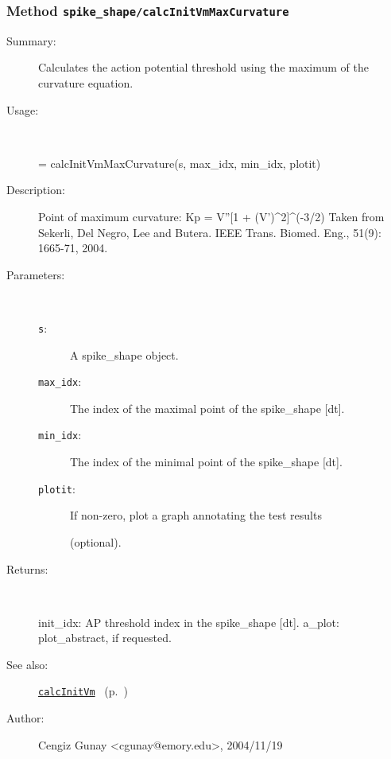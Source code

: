 \subsubsection[Method \texttt{calcInitVmMaxCurvature}]{Method \texttt{spike\_shape/calcInitVmMaxCurvature}}%
%
\label{ref_spike_shape__calcInitVmMaxCurvature}%
\hypertarget{ref_spike_shape__calcInitVmMaxCurvature}{}%
\begin{description}
\item[Summary:]Calculates the action potential threshold using the
			maximum of the curvature equation.
%
\item[Usage:]~%
\begin{lyxcode}%
[init\_idx, a\_plot] = calcInitVmMaxCurvature(s, max\_idx, min\_idx, plotit)
%
\end{lyxcode}%
%
\item[Description:]%
Point of maximum curvature: Kp = V''[1 + (V')\textasciicircum{}2]\textasciicircum{}(-3/2)
 Taken from Sekerli, Del Negro, Lee and Butera. 
 IEEE Trans. Biomed. Eng., 51(9): 1665-71, 2004.
\item[Parameters:]~
\begin{description}%
\item[\texttt{s}:]
 A spike\_shape object.
\item[\texttt{max\_idx}:]
 The index of the maximal point of the spike\_shape [dt].
\item[\texttt{min\_idx}:]
 The index of the minimal point of the spike\_shape [dt].
\item[\texttt{plotit}:]
 If non-zero, plot a graph annotating the test results 

(optional).\end{description}%
%
\item[Returns:]~

	init\_idx: AP threshold index in the spike\_shape [dt].
	a\_plot: plot\_abstract, if requested.
%
%
\item[See also:]%
\hyperlink{ref_calcInitVm}{\texttt{calcInitVm}}%
\ (p.~\pageref{ref_calcInitVm})%
%
%
\item[Author:]%
Cengiz Gunay <cgunay@emory.edu>, 2004/11/19%
\end{description}
\methodline%
